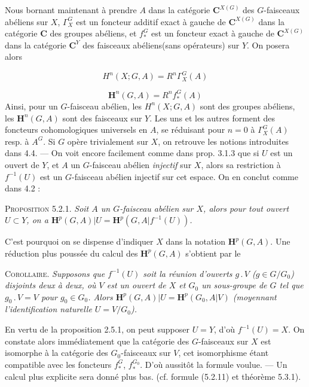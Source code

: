 \clearpage
{}

Nous bornant maintenant à prendre $A$ dans la catégorie ${\mathbf C}^{X(G)}$ des
$G$-faisceaux abéliens sur $X$, $\Gamma_X^G$ est un foncteur additif exact à
gauche de ${\mathbf C}^{X(G)}$ dans la catégorie ${\mathbf C}$ des groupes abéliens, et $f_*^G$
est un foncteur exact à gauche de ${\mathbf C}^{X(G)}$ dans la catégorie ${\mathbf C}^Y$ des
faisceaux abéliens(sans opérateurs) sur $Y$. On posera alors

\[
H^n(X;G,A)=R^n\Gamma_X^G(A)
\tag{5.2.3}
\]

\[
\mathbf H^n(G,A)=R^nf_*^G(A)
\tag{5.2.4}
\]
Ainsi, pour un $G$-faisceau abélien, les $H^n(X;G,A)$ sont des groupes
abéliens, les $\mathbf H^n(G,A)$ sont des faisceaux sur $Y$. Les uns et les
autres forment des foncteurs cohomologiques universels en $A$, se réduisant
pour $n=0$ à $\Gamma_X^G(A)$ resp. à $A^G$. Si $G$ opère trivialement sur
$X$, on retrouve les notions introduites dans 4.4. --- On voit encore
facilement comme dans prop. 3.1.3 que si $U$ est un ouvert de $Y$, et $A$ un
$G$-faisceau abélien \textit{injectif} sur $X$, alors sa restriction à $f^{-1}(U)$ est
un $G$-faisceau abélien injectif sur cet espace. On en conclut comme dans
4.2 :

\textsc{Proposition 5.2.1.} \textit{Soit $A$ un $G$-faisceau abélien
sur $X$, alors pour tout ouvert $U\subset Y$, on a
$\mathbf H^p(G,A)\vert U=\mathbf H^p(G,A\vert f^{-1}(U))$.}

C'est pourquoi on se dispense d'indiquer $X$ dans la notation
$\mathbf H^p(G,A)$. Une réduction plus poussée du calcul des
$\mathbf H^p(G,A)$ s'obtient par le

\textsc{Corollaire.} \textit{Supposons que $f^{-1}(U)$ soit la
réunion d'ouverts $g\mathbin{.}V$ ($g\in G/G_0$) disjoints deux à deux,
où $V$ est un ouvert de $X$ et $G_0$ un sous-groupe de $G$ tel que
$g_0\mathbin{.}V=V$ pour $g_0\in G_0$. Alors
$\mathbf H^p(G,A)\vert U=\mathbf H^p(G_0,A\vert V)$ (moyennant
l'identification naturelle $U=V/G_0$).}

En vertu de la proposition 2.5.1, on peut supposer $U=Y$, d'où
$f^{-1}(U)=X$. On constate alors immédiatement que la catégorie des
$G$-faisceaux sur $X$ est isomorphe à la catégorie des $G_0$-faisceaux sur
$V$, cet isomorphisme étant compatible avec les foncteurs $f_*^G$,
$f_*^{G_0}$. D'où aussitôt la formule voulue. --- Un calcul plus explicite
sera donné plus bas. (cf. formule (5.2.11) et théorème 5.3.1).

